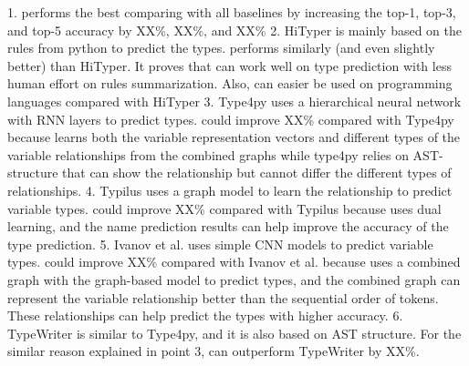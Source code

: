 1. {\tool} performs the best comparing with all baselines by increasing the top-1, top-3, and top-5 accuracy by XX\%, XX\%, and XX\%
2. HiTyper is mainly based on the rules from python to predict the types. {\tool} performs similarly (and even slightly better) than HiTyper. It proves that {\tool} can work well on type prediction with less human effort on rules summarization. Also, {\tool} can easier be used on programming languages compared with HiTyper
3. Type4py uses a hierarchical neural network with RNN layers to predict types. {\tool} could improve XX\% compared with Type4py because {\tool} learns both the variable representation vectors and different types of the variable relationships from the combined graphs while type4py relies on AST-structure that can show the relationship but cannot differ the different types of relationships.
4. Typilus uses a graph model to learn the relationship to predict variable types. {\tool} could improve XX\% compared with Typilus because {\tool} uses dual learning, and the name prediction results can help improve the accuracy of the type prediction.
5. Ivanov et al.\cite{ivanov21predicting} uses simple CNN models to predict variable types. {\tool} could improve XX\% compared with Ivanov et al.\cite{ivanov21predicting} because {\tool} uses a combined graph with the graph-based model to predict types, and the combined graph can represent the variable relationship better than the sequential order of tokens. These relationships can help predict the types with higher accuracy.
6. TypeWriter is similar to Type4py, and it is also based on AST structure. For the similar reason explained in point 3, {\tool} can outperform TypeWriter by XX\%.

